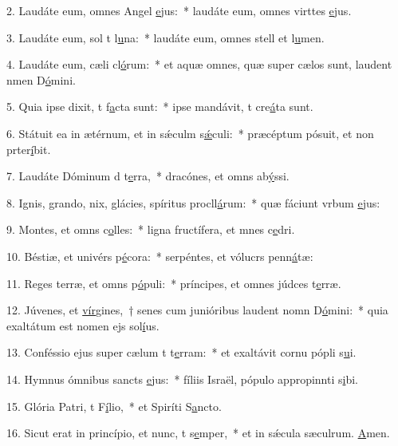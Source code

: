 2. Laudáte eum, omnes Angel \uline{e}jus:~* laudáte eum, omnes virttes \uline{e}jus.\par 
3. Laudáte eum, sol t l\uline{u}na:~* laudáte eum, omnes stell et l\uline{u}men.\par 
4. Laudáte eum, cæli cl\uline{ó}rum:~* et aquæ omnes, quæ super cælos sunt, laudent nmen D\uline{ó}mini.\par 
5. Quia ipse dixit, t f\uline{a}cta sunt:~* ipse mandávit, t cre\uline{á}ta sunt.\par 
6. Státuit ea in ætérnum, et in sǽculm s\uline{ǽ}culi:~* præcéptum pósuit, et non prter\uline{í}bit.\par 
7. Laudáte Dóminum d t\uline{e}rra,~* dracónes, et omns ab\uline{ý}ssi.\par 
8. Ignis, grando, nix, glácies, spíritus procll\uline{á}rum:~* quæ fáciunt vrbum \uline{e}jus:\par 
9. Montes, et omns c\uline{o}lles:~* ligna fructífera, et mnes c\uline{e}dri.\par 
10. Béstiæ, et univérs p\uline{é}cora:~* serpéntes, et vólucrs penn\uline{á}tæ:\par 
11. Reges terræ, et omns p\uline{ó}puli:~* príncipes, et omnes júdces t\uline{e}rræ.\par 
12. Júvenes, et \uline{vír}gines,~† senes cum junióribus laudent nomn D\uline{ó}mini:~* quia exaltátum est nomen ejs sol\uline{í}us.\par 
13. Conféssio ejus super cælum t t\uline{e}rram:~* et exaltávit cornu pópli s\uline{u}i.\par 
14. Hymnus ómnibus sancts \uline{e}jus:~* fíliis Israël, pópulo appropinnti s\uline{i}bi.\par 
15. Glória Patri, t F\uline{í}lio,~* et Spiríti S\uline{a}ncto.\par 
16. Sicut erat in princípio, et nunc, t s\uline{e}mper,~* et in sǽcula sæculrum. \uline{A}men.\par 
